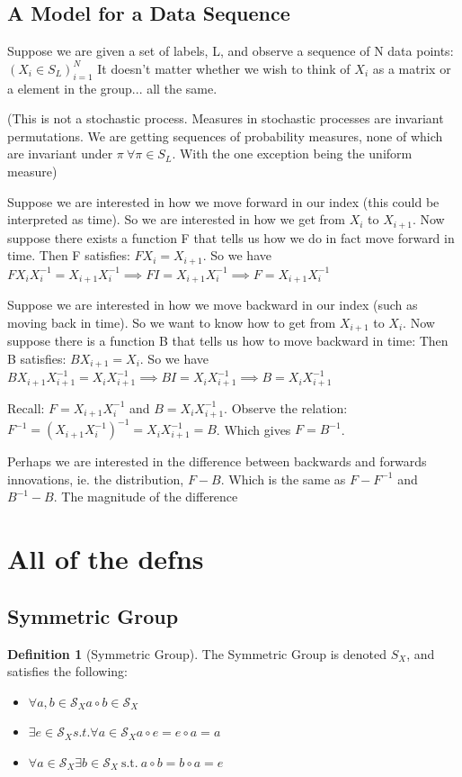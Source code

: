 \documentclass{article}
\theoremstyle{definition}
\newtheorem{definition}{Definition}
\begin{document}
\subsection{A Model for a Data Sequence}
Suppose we are given a set of labels, L, and observe a sequence of N data points: $ (X_i \in S_L)_{i=1}^N$
It doesn't matter whether we wish to think of $X_i$ as a matrix or a element in the group... all the same.

(This is not a stochastic process. Measures in stochastic processes are invariant permutations. We are getting sequences of probability measures, none of which are invariant under $\pi \: \forall \pi \in S_L$. With the one exception being the uniform measure)

Suppose we are interested in how we move forward in our index (this could be interpreted as time). So we are interested in how we get from $X_i$ to $X_{i+1}$. Now suppose there exists a function F that tells us how we do in fact move forward in time.
Then F satisfies: $F X_i = X_{i+1} $. So we have $FX_i X_i^{-1} = X_{i+1}X_i^{-1} \implies FI = X_{i+1}X_i^{-1} \implies F = X_{i+1}X_i^{-1} $ 

Suppose we are interested in how we move backward in our index (such as moving back in time). So we want to know how to get from $X_{i+1}$ to $X_i$. Now suppose there is a function B that tells us how to move backward in time:
Then B satisfies: $BX_{i+1}= X_i$. So we have $BX_{i+1}X_{i+1}^{-1} = X_i X_{i+1}^{-1} \implies B I = X_i X_{i+1}^{-1} \implies  B = X_i X_{i+1}^{-1} $

Recall: $ F = X_{i+1}X_{i}^{-1}$ and $B = X_{i}X_{i+1}^{-1}$. Observe the relation: $F^{-1} = (X_{i+1}X_{i}^{-1})^{-1} = X_{i}X_{i+1}^{-1} = B$. Which gives $F = B^{-1}$.

Perhaps we are interested in the difference between backwards and forwards innovations, ie. the distribution, $F - B$. Which is the same as $F - F^{-1}$ and $B^{-1} - B$. The magnitude of the difference 

\section{All of the defns}
\subsection{Symmetric Group}
\begin{definition}[Symmetric Group] The Symmetric Group is denoted $S_X$, and satisfies the following:
\begin{itemize}
\item \( \forall a,b \in \mathcal{S}_X  a \circ b \in \mathcal{S}_X \)
\item \( \exists e \in \mathcal{S}_X s.t. \forall a \in \mathcal{S}_X a \circ e = e \circ a = a\)
\item \( \forall a \in \mathcal{S}_X \exists b \in \mathcal{S}_X \: \text{s.t.} \: a \circ b = b \circ a = e\)
\end{itemize}
\end{definition}
\end{document}
